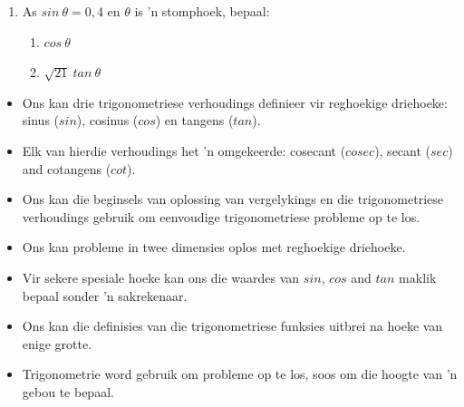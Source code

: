 \begin{exercises}{}
{\begin{enumerate}[itemsep=5pt, label=\textbf{\arabic*}. ]
\item As $sin~\theta= 0,4$ en $\theta$ is 'n stomphoek, bepaal:
\begin{enumerate}[noitemsep, label=\textbf{(\alph*)} ]
 \item $cos~\theta$
\item $\sqrt{21}~tan~\theta$
\end{enumerate}
\end{enumerate}

}
\end{exercises}



\begin{itemize}[noitemsep]
\item Ons kan drie trigonometriese verhoudings definieer vir reghoekige driehoeke: sinus ($sin$), cosinus ($cos$) en tangens ($tan$).
\item Elk van hierdie verhoudings het 'n omgekeerde: cosecant ($cosec$), secant ($sec$) and cotangens ($cot$).
\item Ons kan die beginsels van oplossing van vergelykings en die trigonometriese verhoudings gebruik om eenvoudige trigonometriese probleme op te los.
\item Ons kan probleme in twee dimensies oplos met reghoekige driehoeke.
\item Vir sekere spesiale hoeke kan ons die waardes van $sin$, $cos$ and $tan$ maklik bepaal sonder 'n sakrekenaar.
\item Ons kan die definisies van die trigonometriese funksies uitbrei na hoeke van enige grotte.
\item Trigonometrie word gebruik om probleme op te los, soos om die hoogte van 'n gebou te bepaal.
\end{itemize}


